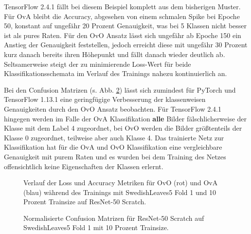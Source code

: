 TensorFlow 2.4.1 \cite{tensorflow} fällt bei diesem Beispiel komplett aus dem bisherigen Muster. Für OvA bleibt die Accuracy, abgesehen von einem schmalen Spike bei Epoche 50, konstant auf ungefähr 20 Prozent Genauigkeit, was bei 5 Klassen nicht besser ist als pures Raten. Für den OvO Ansatz lässt sich ungefähr ab Epoche 150 ein Anstieg der Genauigkeit feststellen, jedoch erreicht diese mit ungefähr 30 Prozent kurz danach bereits ihren Höhepunkt und fällt danach wieder deutlich ab.
Seltsamerweise steigt der zu minimierende Loss-Wert für beide Klassifikationsschemata im Verlauf des Trainings nahezu kontinuierlich an.

Bei den Confusion Matrizen (s. Abb. \ref{fig:ConfusionMatrixB}) lässt sich zumindest für PyTorch \cite{pytorch} und TensorFlow 1.13.1 \cite{tensorflow} eine geringfügige Verbesserung der klassenweisen Genauigkeiten durch den OvO Ansatz beobachten. Für TensorFlow 2.4.1 \cite{tensorflow} hingegen werden im Falle der OvA Klassifikation \textbf{alle} Bilder fälschlicherweise der Klasse mit dem Label 4 zugeordnet, bei OvO werden die Bilder größtenteils der Klasse 0 zugeordnet, teilweise aber auch Klasse 4. Das trainierte Netz zur Klassifikation hat für die OvA und OvO Klassifikation eine vergleichbare Genauigkeit mit purem Raten und es wurden bei dem Training des Netzes offensichtlich keine Eigenschaften der Klassen erlernt.
\begin{figure}[H]
\begin{adjustbox}{width=1.4\textwidth, center}

\end{adjustbox}
\caption{Verlauf der Loss und Accuracy Metriken für OvO (rot) und OvA (blau) während des Trainings mit SwedishLeaves5 Fold 1 und 10 Prozent Trainsize auf ResNet-50 Scratch.}
\label{fig:TrainingsverlaufB}
\end{figure}

\begin{figure}[H]
\begin{adjustbox}{width=1.1\textwidth, center}

\end{adjustbox}
\caption{Normalisierte Confusion Matrizen für ResNet-50 Scratch auf SwedishLeaves5 Fold 1 mit 10 Prozent Trainsize.}
\label{fig:ConfusionMatrixB}
\end{figure}

